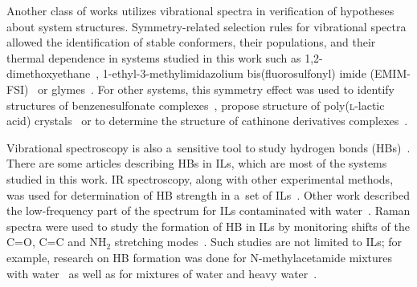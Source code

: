 Another class of works utilizes vibrational spectra in verification of hypotheses about system structures. Symmetry-related selection rules for vibrational spectra allowed the identification of stable conformers, their populations, and their thermal dependence in systems studied in this work such as 1,2-dimethoxyethane~\cite{raman-interactions-1}, 1-ethyl-3-methylimidazolium bis(fluorosulfonyl) imide (EMIM-FSI)~\cite{raman-interactions-2} or glymes~\cite{raman-interactions-3}. For other systems, this symmetry effect was used to identify structures of benzenesulfonate complexes~\cite{ir-interactions-3}, propose structure of poly(\textsc{l}-lactic acid) crystals~\cite{ir-interactions-8} or to determine the structure of cathinone derivatives complexes~\cite{ir-interactions-4}.

Vibrational spectroscopy is also a~sensitive tool to study hydrogen bonds (HBs)~\cite{ir-interactions-15}. There are some articles describing HBs in ILs, which are most of the systems studied in this work. IR spectroscopy, along with other experimental methods, was used for determination of HB strength in a~set of ILs~\cite{ir-interactions-18,ir-interactions-16}. Other work described the low-frequency part of the spectrum for ILs contaminated with water~\cite{ir-interactions-17}. Raman spectra were used to study the formation of HB in ILs by monitoring shifts of the C=O, C=C and NH$_2$ stretching modes~\cite{raman-interactions-4}. Such studies are not limited to ILs; for example, research on HB formation was done for N-methylacetamide mixtures with water~\cite{ir-interactions-2} as well as for mixtures of water and heavy water~\cite{ir-interactions-5}. 

